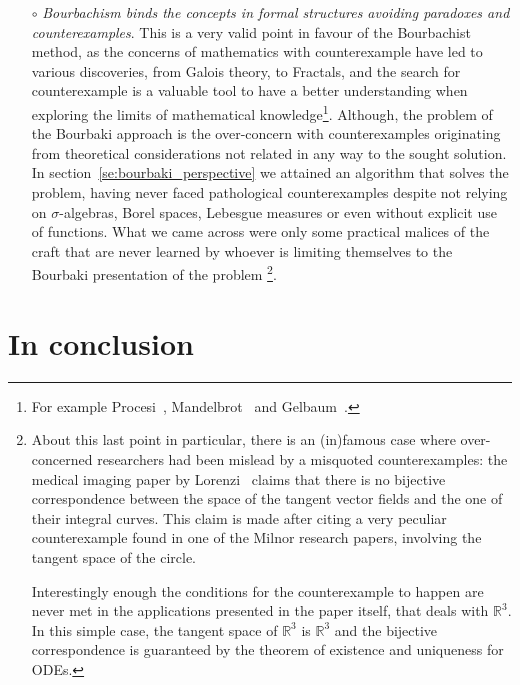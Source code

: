 \documentclass[]{scrartcl}
\theoremstyle{definition}
\begin{document}
\begin{itemize}
    \item[$\circ$] \emph{Bourbachism binds the concepts in formal structures avoiding paradoxes and counterexamples}. This is a very valid point in favour of the Bourbachist method, as the concerns of mathematics with counterexample have led to various discoveries, from Galois theory, to Fractals, and the search for counterexample is a valuable tool to have a better understanding when exploring the limits of mathematical knowledge\footnote{
        For example Procesi~\cite{procesi1977elementi}, Mandelbrot~\cite{mandelbrot1983fractal} and Gelbaum~\cite{gelbaum2003counterexamples}.
    }. Although, the problem of the Bourbaki approach is the over-concern with counterexamples originating from theoretical considerations not related in any way to the sought solution. In section~\ref{se:bourbaki_perspective} we attained an algorithm that solves the problem, having never faced pathological counterexamples despite not relying on $\sigma$-algebras, Borel spaces, Lebesgue measures or even without explicit use of functions. What we came across were only some practical malices of the craft that are never learned by whoever is limiting themselves to the Bourbaki presentation of the problem
    \footnote{
        About this last point in particular, there is an (in)famous case where over-concerned researchers had been mislead by a misquoted counterexamples: the medical imaging paper by Lorenzi~\cite{lorenzi2013geodesics} claims that there is no bijective correspondence between the space of the tangent vector fields and the one of their integral curves. This claim is made after citing a very peculiar counterexample found in one of the Milnor research papers, involving the tangent space of the circle.

        Interestingly enough the conditions for the counterexample to happen are never met in the applications presented in the paper itself, that deals with $\mathbb{R}^3$. In this simple case, the tangent space of $\mathbb{R}^3$ is $\mathbb{R}^3$ and the bijective correspondence is guaranteed by the theorem of existence and uniqueness for ODEs.
    }.

\end{itemize}



\section{In conclusion}
\end{document}
